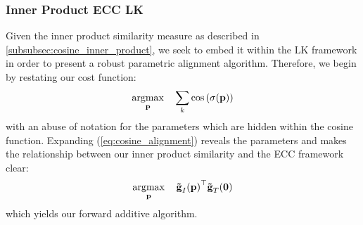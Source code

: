 \subsubsection{Inner Product ECC LK}\label{subsubsec:lk-inner-product}
Given the inner product similarity measure as described in
\cref{subsubsec:cosine_inner_product}, we seek to embed it within the LK
framework in order to present a robust parametric alignment algorithm.
Therefore, we begin by restating our cost function:
\begin{equation}\label{eq:cosine_alignment}
   \argmax_{\p} \quad \sum_k \cos{\left(\sigma(\p)\right)}
\end{equation}
with an abuse of notation for the parameters which are hidden within the cosine
function. Expanding (\ref{eq:cosine_alignment}) reveals the parameters and makes
the relationship between our inner product similarity and the ECC framework
clear:
\begin{equation}\label{eq:ip-ecc-lk-max}
   \argmax_{\p} \quad {\bb{\tilde{g}}_{I}(\p)}^{\top} \bb{\tilde{g}}_T(\zero)
\end{equation}
which yields our forward additive algorithm.

